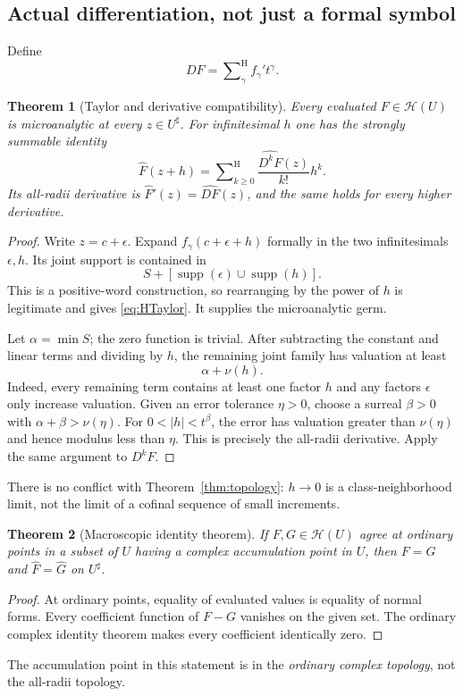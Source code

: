 \documentclass[11pt,oneside]{article}
\newtheorem{theorem}{Theorem}[section]
\theoremstyle{definition}\newtheorem{definition}[theorem]{Definition}
\newcommand{\HH}{\mathcal H}
\newcommand{\supp}{\operatorname{supp}}
\newcommand{\Hsum}{\mathop{\sum}\nolimits^{\mathrm H}}
\newcommand{\hatF}{\widehat F}
\newcommand{\val}{\nu}
\begin{document}
\subsection{Actual differentiation, not just a formal symbol}
Define
\[
 DF=\Hsum_\gamma f_\gamma' t^\gamma.
\]
\begin{theorem}[Taylor and derivative compatibility]\label{thm:derivative}
Every evaluated $F\in\HH(U)$ is microanalytic at every $z\in U^\sharp$. For infinitesimal $h$ one has the strongly summable identity
\begin{equation}\label{eq:HTaylor}
 \hatF(z+h)=\Hsum_{k\geq0}\frac{\widehat{D^kF}(z)}{k!}h^k.
\end{equation}
Its all-radii derivative is $\hatF'(z)=\widehat{DF}(z)$, and the same holds for every higher derivative.
\end{theorem}
\begin{proof}
Write $z=c+\epsilon$. Expand $f_\gamma(c+\epsilon+h)$ formally in the two infinitesimals $\epsilon,h$. Its joint support is contained in
\[
 S+[\supp(\epsilon)\cup\supp(h)].
\]
This is a positive-word construction, so rearranging by the power of $h$ is legitimate and gives \eqref{eq:HTaylor}. It supplies the microanalytic germ.

Let $\alpha=\min S$; the zero function is trivial. After subtracting the constant and linear terms and dividing by $h$, the remaining joint family has valuation at least
\[
 \alpha+\val(h).
\]
Indeed, every remaining term contains at least one factor $h$ and any factors $\epsilon$ only increase valuation. Given an error tolerance $\eta>0$, choose a surreal $\beta>0$ with $\alpha+\beta>\val(\eta)$. For $0<|h|<t^\beta$, the error has valuation greater than $\val(\eta)$ and hence modulus less than $\eta$. This is precisely the all-radii derivative. Apply the same argument to $D^kF$.
\end{proof}
There is no conflict with Theorem~\ref{thm:topology}: $h\to0$ is a class-neighborhood limit, not the limit of a cofinal sequence of small increments.

\begin{theorem}[Macroscopic identity theorem]\label{thm:identity}
If $F,G\in\HH(U)$ agree at ordinary points in a subset of $U$ having a complex accumulation point in $U$, then $F=G$ and $\hatF=\widehat G$ on $U^\sharp$.
\end{theorem}
\begin{proof}
At ordinary points, equality of evaluated values is equality of normal forms. Every coefficient function of $F-G$ vanishes on the given set. The ordinary complex identity theorem makes every coefficient identically zero.
\end{proof}
The accumulation point in this statement is in the \emph{ordinary complex topology}, not the all-radii topology.
\end{document}
